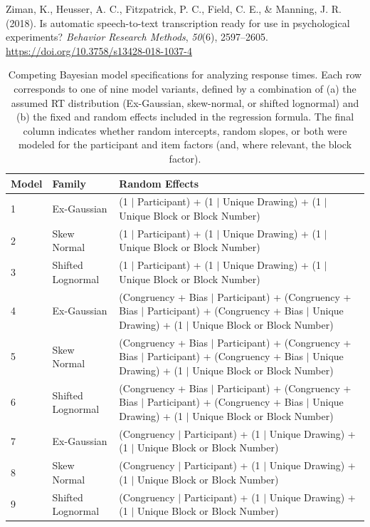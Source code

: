 \documentclass[
  ,man,floatsintext]{apa6}
\newlength{\cslhangindent}
\newlength{\cslentryspacingunit} %
\newenvironment{CSLReferences}[2] %
 {%
  \setlength{\parindent}{0pt}
  \ifodd #1
  \let\oldpar\par
  \def\par{\hangindent=\cslhangindent\oldpar}
  \fi
  \setlength{\parskip}{#2\cslentryspacingunit}
 }%
 {}
\begin{document}
\begin{CSLReferences}{1}{0}
\leavevmode{}%
Ziman, K., Heusser, A. C., Fitzpatrick, P. C., Field, C. E., \& Manning, J. R. (2018). Is automatic speech-to-text transcription ready for use in psychological experiments? \emph{Behavior Research Methods}, \emph{50}(6), 2597--2605. \url{https://doi.org/10.3758/s13428-018-1037-4}

\end{CSLReferences}

\newpage

\setcounter{table}{0}
\renewcommand{\tablename}{Supplementary Table}
\setcounter{figure}{0}
\renewcommand{\figurename}{Supplementary Figure}

\begin{table}[ht]
\centering
\caption{Competing Bayesian model specifications for analyzing response times. Each row
corresponds to one of nine model variants, defined by a combination of (a) the
assumed RT distribution (Ex-Gaussian, skew-normal, or shifted lognormal) and
(b) the fixed and random effects included in the regression formula. The final
column indicates whether random intercepts, random slopes, or both were modeled
for the participant and item factors (and, where relevant, the block factor).} 
\begin{tabular}{ll|p{4in}}
 Model & Family & Random Effects \\ 
  \hline
1 & Ex-Gaussian & (1 $|$ Participant) + (1 $|$ Unique Drawing) + (1 $|$ Unique Block or Block Number) \\ 
   \hline
2 & Skew Normal & (1 $|$ Participant) + (1 $|$ Unique Drawing) + (1 $|$ Unique Block or Block Number) \\ 
   \hline
3 & Shifted Lognormal & (1 $|$ Participant) + (1 $|$ Unique Drawing) + (1 $|$ Unique Block or Block Number) \\ 
   \hline
4 & Ex-Gaussian & (Congruency + Bias $|$ Participant) + (Congruency + Bias $|$ Participant) + (Congruency + Bias $|$ Unique Drawing) + (1 $|$ Unique Block or Block Number) \\ 
   \hline
5 & Skew Normal & (Congruency + Bias $|$ Participant) + (Congruency + Bias $|$ Participant) + (Congruency + Bias $|$ Unique Drawing) + (1 $|$ Unique Block or Block Number) \\ 
   \hline
6 & Shifted Lognormal & (Congruency + Bias $|$ Participant) + (Congruency + Bias $|$ Participant) + (Congruency + Bias $|$ Unique Drawing) + (1 $|$ Unique Block or Block Number) \\ 
   \hline
7 & Ex-Gaussian & (Congruency $|$ Participant) + (1 $|$ Unique Drawing) + (1 $|$ Unique Block or Block Number) \\ 
   \hline
8 & Skew Normal & (Congruency $|$ Participant) + (1 $|$ Unique Drawing) + (1 $|$ Unique Block or Block Number) \\ 
   \hline
9 & Shifted Lognormal & (Congruency $|$ Participant) + (1 $|$ Unique Drawing) + (1 $|$ Unique Block or Block Number) \\ 
   \hline
\end{tabular}
\end{table}
\end{document}

